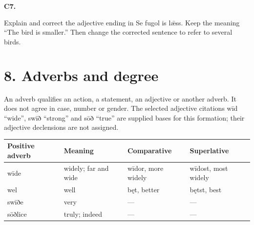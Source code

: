 \par\begin{minipage}{\linewidth}\raggedright
\textbf{C7.}

Explain and correct the adjective ending in Se fugol is lǣss. Keep the meaning “The bird is smaller.” Then change the corrected sentence to refer to several birds.

\end{minipage}\par\addvspace{4pt}

\section*{8. Adverbs and degree}

An adverb qualifies an action, a statement, an adjective or another adverb. It does not agree in case, number or gender. The selected adjective citations wīd “wide”, swīð “strong” and sōð “true” are supplied bases for this formation; their adjective declensions are not assigned.

\par\begingroup
\fontsize{10.5}{13.2}\selectfont
\setlength{\LTleft}{0pt}\setlength{\LTright}{\fill}
\noindent
\begin{tabular}{@{}>{\raggedright\arraybackslash}p{24.43mm}>{\raggedright\arraybackslash}p{28.15mm}>{\raggedright\arraybackslash}p{31.0mm}>{\raggedright\arraybackslash}p{31.99mm}@{}}
\toprule
\textbf{Positive adverb} & \textbf{Meaning} & \textbf{Comparative} & \textbf{Superlative} \\
\midrule
wīde & widely; far and wide & wīdor, more widely & wīdost, most widely \\
wel & well & bęt, better & bętst, best \\
swīðe & very & — & — \\
sōðlice & truly; indeed & — & — \\
\bottomrule
\end{tabular}
\par\endgroup

